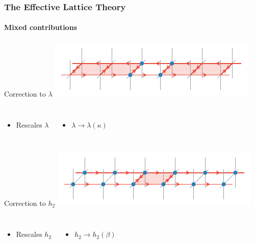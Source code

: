 \documentclass[12pt,a4paper,dvipsnames,usenames]{beamer}
\begin{document}
\begin{frame}
  \frametitle{The Effective Lattice Theory}
  \framesubtitle{Mixed contributions}

  \begin{block}{Correction to $\lambda$}
    \centering
    \includegraphics{Figs/lambdarenorm.pdf}
    \vspace*{-.5em}

  \begin{columns}
  \begin{itemize}
    \item \color{LightUIBase} Rescales $\lambda$ 
  \end{itemize}
  \begin{itemize}
    \item \color{LightUIBase} $\lambda \to \lambda(\kappa)$
  \end{itemize}
  \end{columns}
  \end{block}
  

  \begin{block}{Correction to $h_2$}
  \centering
  \includegraphics{Figs/h2renorm.pdf}
  \vspace*{-.5em}

  \begin{columns}
  \begin{itemize}
    \item \color{LightUIBase} Rescales $h_2$ 
  \end{itemize}
  \begin{itemize}
    \item \color{LightUIBase} $h_2 \to h_2(\beta)$
  \end{itemize}
  \end{columns}
  \end{block}


\end{frame}
\end{document}
